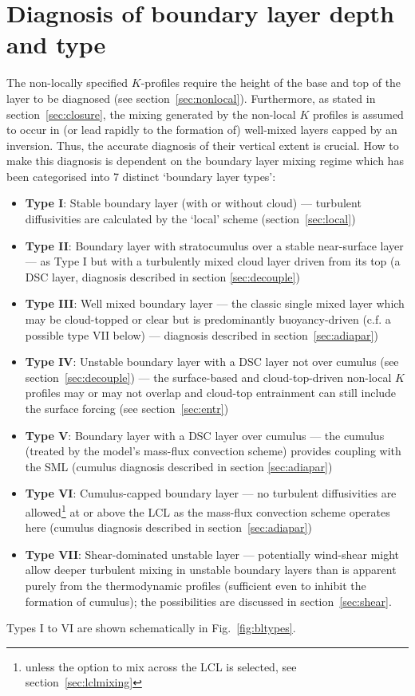 \documentclass{UMDP_article}
\begin{document}
\section{Diagnosis of boundary layer depth and type}
\label{sec:types}

The non-locally specified $K$-profiles require the height of the base
and top of the layer to be diagnosed (see section~\ref{sec:nonlocal}).
Furthermore, as stated in section~\ref{sec:closure}, the mixing
generated by the non-local $K$ profiles is assumed to occur in (or
lead rapidly to the formation of) well-mixed layers capped by an
inversion.  Thus, the accurate diagnosis of their vertical extent is
crucial.  How to make this diagnosis is dependent on the boundary
layer mixing regime which has been categorised into 7 distinct
`boundary layer types':
\begin{itemize}
\item{\bf Type I}: Stable boundary layer (with or without cloud) ---
  turbulent diffusivities are calculated by the `local' scheme
  (section~\ref{sec:local})
\item{\bf Type II}: Boundary layer with stratocumulus over a stable
  near-surface layer --- as Type I but with a turbulently mixed cloud
  layer driven from its top (a DSC layer, diagnosis described in
  section \ref{sec:decouple})
\item{\bf Type III}: Well mixed boundary layer --- the classic single
  mixed layer which may be cloud-topped or clear but is predominantly
  buoyancy-driven (\mbox{c.f.} a possible type VII below) ---
  diagnosis described in section~\ref{sec:adiapar})
\item{\bf Type IV}: Unstable boundary layer with a DSC layer not over
  cumulus (see section~\ref{sec:decouple}) --- the surface-based and
  cloud-top-driven non-local $K$ profiles may or may not overlap and
  cloud-top entrainment can still include the surface forcing (see
  section~\ref{sec:entr})
\item{\bf Type V}: Boundary layer with a DSC layer over cumulus ---
  the cumulus (treated by the model's mass-flux convection scheme)
  provides coupling with the SML (cumulus diagnosis described in
  section \ref{sec:adiapar})
\item{\bf Type VI}: Cumulus-capped boundary layer --- no turbulent
  diffusivities are allowed\footnote{unless the option to mix across
    the LCL is selected, see section~\ref{sec:lclmixing}} at or above
  the LCL as the mass-flux convection scheme operates here (cumulus
  diagnosis described in section~\ref{sec:adiapar})
\item{\bf Type VII}: Shear-dominated unstable layer --- potentially
  wind-shear might allow deeper turbulent mixing in unstable boundary
  layers than is apparent purely from the thermodynamic profiles
  (sufficient even to inhibit the formation of cumulus); the
  possibilities are discussed in section~\ref{sec:shear}.
\end{itemize}
Types I to VI are shown schematically in Fig.~\ref{fig:bltypes}.
\end{document}
